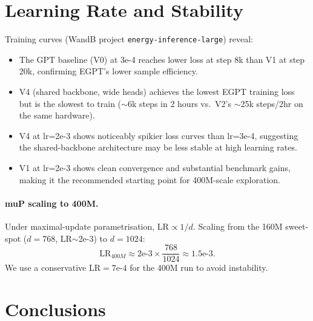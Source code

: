 \documentclass[11pt,a4paper]{article}
\begin{document}
\section{Learning Rate and Stability}

Training curves (WandB project \texttt{energy-inference-large}) reveal:
\begin{itemize}
  \item The GPT baseline (V0) at 3e-4 reaches lower loss at step 8k than V1 at step 20k,
    confirming EGPT's lower sample efficiency.
  \item V4 (shared backbone, wide heads) achieves the lowest EGPT training loss but is
    the slowest to train ($\sim$6k steps in 2 hours vs.\ V2's $\sim$25k steps/2hr on
    the same hardware).
  \item V4 at lr=2e-3 shows noticeably spikier loss curves than lr=3e-4, suggesting the
    shared-backbone architecture may be less stable at high learning rates.
  \item V1 at lr=2e-3 shows clean convergence and substantial benchmark gains,
    making it the recommended starting point for 400M-scale exploration.
\end{itemize}

\paragraph{muP scaling to 400M.}
Under maximal-update parametrisation, $\text{LR} \propto 1/d$.  Scaling from the
160M sweet-spot ($d=768$, LR$\sim$2e-3) to $d=1024$:
\[
  \text{LR}_{400M} \approx 2\text{e-3} \times \frac{768}{1024} \approx 1.5\text{e-3}.
\]
We use a conservative LR$=7\text{e-4}$ for the 400M run to avoid instability.

\section{Conclusions}
\end{document}

